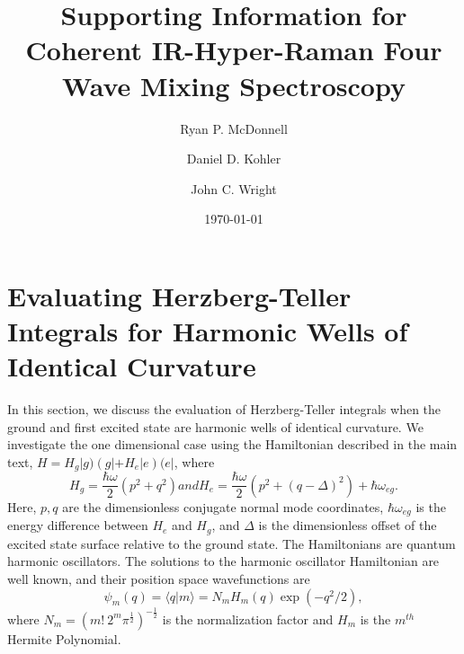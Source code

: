 \documentclass[aip, jcp, reprint, onecolumn, nofootinbib]{revtex4-2}
\begin{document}
\title{Supporting Information for Coherent IR-Hyper-Raman Four Wave Mixing Spectroscopy}


\author{Ryan P. McDonnell} 
\author{Daniel D. Kohler}
\author{John C. Wright} 


\date{\today}

\maketitle
\tableofcontents
\clearpage


\section{Evaluating Herzberg-Teller Integrals for Harmonic Wells of Identical Curvature}

In this section, we discuss the evaluation of Herzberg-Teller integrals when the ground and first excited state are harmonic wells of identical curvature.\cite{HerzbergTeller1933}
We investigate the one dimensional case using the Hamiltonian described in the main text, $H = H_g |g) \left(g| + H_e |e\right) (e|$, where
\begin{subequations}\label{Hamiltonian}
	\begin{equation}
		H_g = \frac{\hbar \omega }{2} \left(p^2 + q^2 \right)
	\end{equation}
	and
	\begin{equation}
		H_e = \frac{\hbar \omega }{2} \left(p^2 +  (q-\Delta)^2 \right) + \hbar \omega_{eg}.
	\end{equation} 
\end{subequations}
Here, $p,q$ are the dimensionless conjugate normal mode coordinates, $\hbar\omega_{eg}$ is the energy difference between $H_e$ and $H_g$, and $\Delta$ is the dimensionless offset of the excited state surface relative to the ground state.
The Hamiltonians are quantum harmonic oscillators.
The solutions to the harmonic oscillator Hamiltonian are well known, and their position space wavefunctions are
\begin{equation}
	\psi_m(q) = \langle q | m \rangle = N_m H_m(q) \exp(-q^2/2),
\end{equation}
where $N_m = (m! \ 2^m \pi^{\frac{1}{2}})^{-\frac{1}{2}}$ is the normalization factor and $H_m$ is the $m^{th}$ Hermite Polynomial.\cite{RN230, MorseFeshbach}
\end{document}
